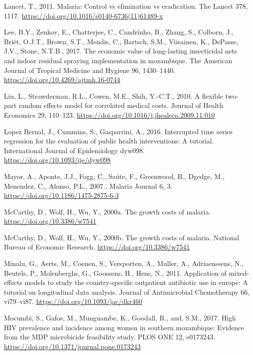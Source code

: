 \documentclass[]{article}
\begin{document}
\hypertarget{ref-TheLancet2011}{}
Lancet, T., 2011. Malaria: Control vs elimination vs eradication. The
Lancet 378, 1117. \url{https://doi.org/10.1016/s0140-6736(11)61489-x}

\hypertarget{ref-Lee2017}{}
Lee, B.Y., Zenkov, E., Chatterjee, C., Candrinho, B., Zhang, S.,
Colborn, J., Briët, O.J.T., Brown, S.T., Mendis, C., Bartsch, S.M.,
Viisainen, K., DePasse, J.V., Stone, N.T.B., 2017. The economic value of
long-lasting insecticidal nets and indoor residual spraying
implementation in mozambique. The American Journal of Tropical Medicine
and Hygiene 96, 1430--1440. \url{https://doi.org/10.4269/ajtmh.16-0744}

\hypertarget{ref-Liu2010}{}
Liu, L., Strawderman, R.L., Cowen, M.E., Shih, Y.-C.T., 2010. A flexible
two-part random effects model for correlated medical costs. Journal of
Health Economics 29, 110--123.
\url{https://doi.org/10.1016/j.jhealeco.2009.11.010}

\hypertarget{ref-Lopez_Bernal_2016}{}
Lopez Bernal, J., Cummins, S., Gasparrini, A., 2016. Interrupted time
series regression for the evaluation of public health interventions: A
tutorial. International Journal of Epidemiology dyw098.
\url{https://doi.org/10.1093/ije/dyw098}

\hypertarget{ref-Mayor2007}{}
Mayor, A., Aponte, J.J., Fogg, C., Saúte, F., Greenwood, B., Dgedge, M.,
Menendez, C., Alonso, P.L., 2007.. Malaria Journal 6, 3.
\url{https://doi.org/10.1186/1475-2875-6-3}

\hypertarget{ref-McCarthy_2000}{}
McCarthy, D., Wolf, H., Wu, Y., 2000a. The growth costs of malaria.
\url{https://doi.org/10.3386/w7541}

\hypertarget{ref-McCarthy2000}{}
McCarthy, D., Wolf, H., Wu, Y., 2000b. The growth costs of malaria.
National Bureau of Economic Research.
\url{https://doi.org/10.3386/w7541}

\hypertarget{ref-Minalu2011}{}
Minalu, G., Aerts, M., Coenen, S., Versporten, A., Muller, A.,
Adriaenssens, N., Beutels, P., Molenberghs, G., Goossens, H., Hens, N.,
2011. Application of mixed-effects models to study the country-specific
outpatient antibiotic use in europe: A tutorial on longitudinal data
analysis. Journal of Antimicrobial Chemotherapy 66, vi79--vi87.
\url{https://doi.org/10.1093/jac/dkr460}

\hypertarget{ref-Mocumbi2017}{}
Mocumbi, S., Gafos, M., Munguambe, K., Goodall, R., and, S.M., 2017.
High HIV prevalence and incidence among women in southern mozambique:
Evidence from the MDP microbicide feasibility study. PLOS ONE 12,
e0173243. \url{https://doi.org/10.1371/journal.pone.0173243}
\end{document}
